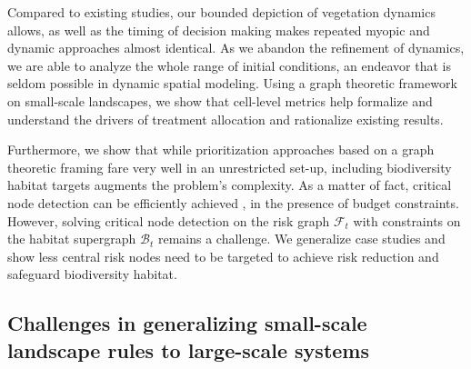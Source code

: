 Compared to existing studies, our bounded depiction of vegetation dynamics allows, as well as the timing of decision making makes repeated myopic and dynamic approaches almost identical. As we abandon the refinement of dynamics, we are able to analyze the whole range of initial conditions, an endeavor that is seldom possible in dynamic spatial modeling. Using a graph theoretic framework on small-scale landscapes, we show that cell-level metrics help formalize and understand the drivers of treatment allocation and rationalize existing results. 

Furthermore, we show that while prioritization approaches based on a graph theoretic framing fare very well in an unrestricted set-up, including biodiversity habitat targets augments the problem's complexity. As a matter of fact, critical node detection can be efficiently achieved \citep{ARULSELVAN20092193}, in the presence of budget constraints. However, solving critical node detection on the risk graph $\mathcal{F}_t$ with constraints on the habitat supergraph $\mathcal{B}_t$ remains a challenge. We generalize case studies \citep{yemshanov_exploring_2022} and show less central risk nodes need to be targeted to achieve risk reduction and safeguard biodiversity habitat.

\subsection{Challenges in generalizing small-scale landscape rules to large-scale systems}

